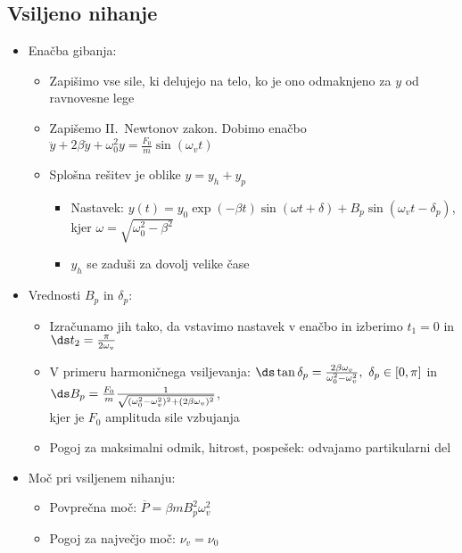 \subsection{Vsiljeno nihanje}
\begin{itemize}
    \item Enačba gibanja:
    \begin{itemize}
        \item Zapišimo vse sile, ki delujejo na telo, ko je ono odmaknjeno za \(y\) od ravnovesne lege
        \item Zapišemo II.\ Newtonov zakon. Dobimo enačbo \(\ddot{y} + 2 \beta \dot{y} + \omega_0^2y = \frac{F_0}{m} \sin(\omega_vt)\)
        \item Splošna rešitev je oblike \(y = y_h + y_p\)
        \begin{itemize}
            \item Nastavek: \(y(t) = y_0 \exp (-\beta t) \sin (\omega t + \delta) + B_p \sin(\omega_v t - \delta_p)\), kjer \(\omega = \sqrt{\omega_0^2 - \beta^2}\)
            \item \(y_h\) se zaduši za dovolj velike čase
        \end{itemize}
    \end{itemize}
    \item Vrednosti \(B_p\) in \(\delta_p\):
    \begin{itemize}
        \item Izračunamo jih tako, da vstavimo nastavek v enačbo in izberimo \(t_1 = 0\) in \(\ds t_2 = \frac{\pi}{2 \omega_v}\)
        \item V primeru harmoničnega vsiljevanja: \(\ds \tan \delta_p = \frac{2 \beta \omega_v }{\omega_0^2 - \omega_v^2}, \ \delta_p \in [0, \pi]\) in \(\ds B_p = \frac{F_0}{m} \frac{1}{\sqrt{(\omega_0^2 - \omega_v^2)^2 + (2 \beta \omega_v)^2}}\), \\ kjer je \(F_0\) amplituda sile vzbujanja
        \item Pogoj za maksimalni odmik, hitrost, pospešek: odvajamo partikularni del
    \end{itemize}
    \item Moč pri vsiljenem nihanju:
    \begin{itemize}
        \item Povprečna moč: \(\overline{P} = \beta m B_p^2 \omega_v^2\)
        \item Pogoj za največjo moč: \(\nu_v = \nu_0\)
    \end{itemize}
\end{itemize}

